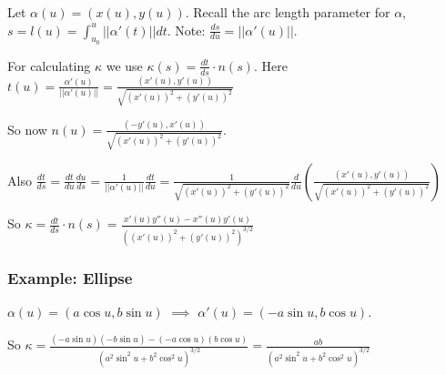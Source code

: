 Let $\alpha(u) = (x(u), y(u))$. Recall the arc length parameter for $\alpha$, $s = l(u) = \int_{u_0}^u || \alpha'(t)|| dt$. Note: $\frac{ds}{du} = || \alpha'(u)||.$

For calculating $\kappa$ we use $\kappa(s) = \frac{dt}{ds} \cdot n(s)$. Here $t(u) = \frac{\alpha'(u)}{||\alpha'(u)||} = \frac{(x'(u), y'(u))}{\sqrt{(x'(u))^2 + (y'(u))^2}}$

So now $n(u) = \frac{(-y'(u), x'(u))}{\sqrt{(x'(u))^2 + (y'(u))^2}}$.

Also $\frac{dt}{ds} = \frac{dt}{du} \frac{du}{ds} = \frac{1}{||\alpha'(u)||} \frac{dt}{du} = \frac{1}{\sqrt{(x'(u))^2 + (y'(u))^2}} \frac{d}{du} \left(\frac{(x'(u), y'(u))}{\sqrt{(x'(u))^2 + (y'(u))^2}}\right)$

So $\kappa = \frac{dt}{ds} \cdot n(s) = \frac{x'(u) y''(u) - x''(u) y'(u)}{((x'(u))^2 + (y'(u))^2)^{3/2}}$

\subsubsection*{Example: Ellipse}

$\alpha (u) = (a \cos u, b \sin u)$ $\implies$ $\alpha'(u) = (- a \sin u, b \cos u)$.

So $\kappa = \frac{(-a \sin u)(-b \sin u) - (-a \cos u)(b \cos u)}{(a^2 \sin^2 u + b^2 \cos^2 u)^{3/2}} = \frac{ab}{(a^2 \sin^2 u + b^2 \cos^2 u)^{3/2}}$